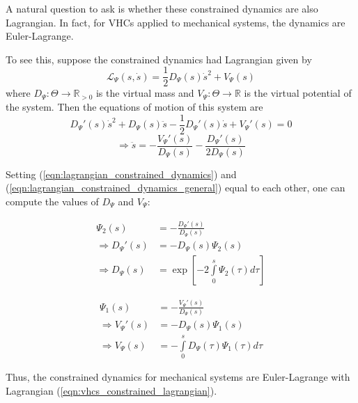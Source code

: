 A natural question to ask is whether these constrained dynamics are also
Lagrangian. In fact, for VHCs applied to mechanical systems, the dynamics are
Euler-Lagrange. \cite{lagrangian_structure_reduced_dynamics_vhcs}

To see this, suppose the constrained dynamics had Lagrangian given by
\begin{equation}\label{eqn:vhcs_constrained_lagrangian}
   \mathcal{L}_{\Psi}(s,\dot{s}) = \frac{1}{2}
   D_{\Psi}(s)\dot{s}^2 + V_{\Psi}(s)
\end{equation}
where \(D_{\Psi} : \Theta \rightarrow \mathbb{R}_{>0}\) is the virtual mass
and \(V_{\Psi} : \Theta \rightarrow \mathbb{R}\) is the virtual potential of the
system. Then the equations of motion of this system are
\begin{equation*}
   D_{\Psi}'(s)\dot{s}^2 + D_{\Psi}(s)\ddot{s} - \frac{1}{2}D_{\Psi}'(s)\dot{s}
   + V_{\Psi}'(s) = 0
\end{equation*}
\begin{equation}\label{eqn:lagrangian_constrained_dynamics_general}
   \Rightarrow \ddot{s} = -\frac{V_{\Psi}'(s)}{D_{\Psi}(s)} -
   \frac{D_{\Psi}'(s)}{2 D_{\Psi}(s)}
\end{equation}

Setting (\ref{eqn:lagrangian_constrained_dynamics}) and
(\ref{eqn:lagrangian_constrained_dynamics_general}) equal to each other, one
can compute the values of \(D_{\Psi}\) and \(V_{\Psi}\): 

\begin{minipage}{0.48\textwidth}
\begin{align*}
   \Psi_2(s) &= -\frac{D_{\Psi}'(s)}{D_\Psi(s)} \\
   \Rightarrow D_{\Psi}'(s) &= -D_{\Psi}(s) \Psi_2(s) \\
   \Rightarrow D_{\Psi}(s) &= \exp\left[ 
   -2\int \limits_{0}^s \Psi_2(\tau) d\tau \right]
\end{align*}
\end{minipage}
\begin{minipage}{0.48\textwidth}
\begin{align*}
   \Psi_1(s) &= -\frac{V_{\Psi}'(s)}{D_{\Psi}(s)} \\
   \Rightarrow V_{\Psi}'(s) &= -D_{\Psi}(s) \Psi_1(s) \\
   \Rightarrow V_{\Psi}(s) &= - \int \limits_{0}^s
   D_{\Psi}(\tau)\Psi_1(\tau)d\tau
\end{align*}
\end{minipage}

Thus, the constrained dynamics for mechanical systems are Euler-Lagrange with
Lagrangian (\ref{eqn:vhcs_constrained_lagrangian}).


